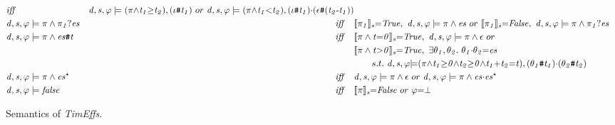 \documentclass[acmsmall,10pt,review]{acmart}
\newcommand{\es}{\theta}
\newcommand{\ev}{\iota}
\newcommand{\timedEffects}{\emph{TimEffs}}
\newcommand{\code}[1]{{\tt{\ensuremath{\m{#1}}}}}
\newcommand{\empt}{\textcolor{black}{\ensuremath{\epsilon}}}
\newcommand{\bott}{\textcolor{black}{\ensuremath{\bot}}}
\newcommand{\m}{\mathit}
\newcommand{\mysharp}{{\mathrel{\texttt{\#}}}}
\begin{document}
{\begin{figure}[]
\begin{align*}
&\m{iff}\quad & \code{d, s, \varphi \models {(\pi{\wedge}t_1 {\geq}t_2)}, (\ev\mysharp t_1) } 
\ or\ \code{d, s, \varphi \models {(\pi{\wedge}t_1 {<}t_2)}  , (\ev\mysharp t_1){\cdot}(\epsilon \mysharp  (t_2\text{-}t_1))  } \\
&\code{d, s, \varphi \models {\pi} \wedge \pi_1 ? es}  &\m{iff}\quad & 
\code{\llbracket \pi_1  \rrbracket_{s} {=}  
 {True} }, \ \code{d, s, \varphi \models {\pi}  \wedge es}\ or  \ 
  \code{\llbracket \pi_1 \rrbracket_{s} {=}  
{False} }, 
\  \code{d, s, \varphi \models {\pi} \wedge \pi_1 ? es}\\
&\code{d, s, \varphi \models {\pi}  \wedge es\mysharp  t}  &\m{iff}\quad &
 \code{\llbracket {\pi}  \wedge t {=} 0 \rrbracket_{s} {=}  
 {True} }, \ \code{d, s, \varphi \models {\pi}  \wedge \empt}\ or  \\
& & &  \code{\llbracket {\pi}\wedge t {>} 0 \rrbracket_{s} {=}  
{True} }, 
\  \exists \code{\es_1,\es_2}. \  \code{\es_1 {\cdot} \es_2 {=} es}\\
&&& \qquad  s.t. \ \code{d, s, \varphi {\models} {(\pi 
{\wedge} t_1{\geq}0{\wedge}t_2{\geq}0 {\wedge} t_1{+} t_2{=}t)}  , 
(\es_1\mysharp t_1) {\cdot} (\es_2\mysharp t_2) } \\
&\code{d, s, \varphi \models {\pi}\wedge es^\star}  &\m{iff}\quad & 
\code{d, s, \varphi \models {\pi}  \wedge \empt}\ or \ 
\code{d, s, \varphi \models {\pi}  \wedge es {\cdot} es^\star}\\
& \code{d, s, \varphi \models false}  &\m{iff}\quad &
 \code{\llbracket {\pi}  \rrbracket_{s} {=} {False} } \ or \ \code{\varphi {=} \bott}
\end{align*}
  \vspace{-2mm}
\caption{Semantics of \timedEffects.}
\label{fig:Sementic}
\vspace{-2mm}
\end{figure}




}
\end{document}
